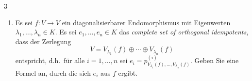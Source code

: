 \begin{question}[subtitle = Äquivalenz von complete sets of orthogonal idempotents und endlichen direkten Summen]{3}
\begin{enumerate}[leftmargin=*]
\begin{align*}
          \begin{tabular}{c}
            $e_1, \dotsc, e_n \in \End(V)$  \\
            ist ein \emph{complete set}     \\
            \emph{of orthogonal}            \\
            \emph{idempotents}
          \end{tabular}
        \right\}
        \\
        (U_1, \dotsc, U_n)
        &\longmapsto
        \left( p^{(1)}_{U_1, \dotsc, U_n}, \dotsc, p^{(n)}_{U_1, \dotsc, U_n} \right)
        \\
        (\im e_1, \dotsc, \im e_n)
        &\longmapsfrom
        (e_1, \dotsc, e_n)
      \end{align*}
    \item
      Es sei $f \colon V \to V$ ein diagonalisierbarer Endomorphismus mit Eigenwerten $\lambda_1, \dotsc, \lambda_n \in K$.
      Es sei $e_1, \dotsc, e_n \in K$ das \emph{complete set of orthogonal idempotents}, dass der Zerlegung
      \[
        V = V_{\lambda_1}(f) \oplus \dotsb \oplus V_{\lambda_n}(f)
      \]
      entspricht, d.h.\ für alle $i = 1, \dotsc, n$ sei $e_i = p^{(i)}_{V_{\lambda_1}(f), \dots, V_{\lambda_n}(f)}$.
      Geben Sie eine Formel an, durch die sich $e_i$ aus $f$ ergibt.
  \end{enumerate}
\end{question}



